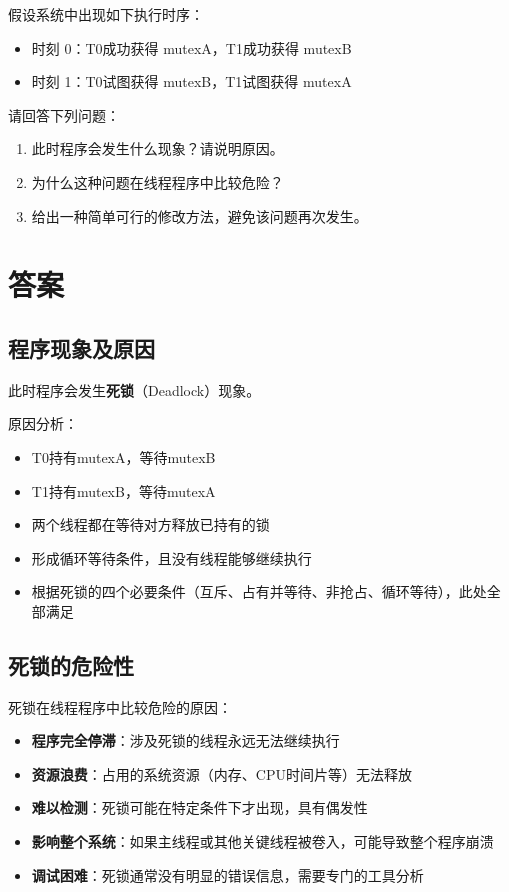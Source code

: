 假设系统中出现如下执行时序：
\begin{itemize}
    \item 时刻 0：T0成功获得 mutexA，T1成功获得 mutexB
    \item 时刻 1：T0试图获得 mutexB，T1试图获得 mutexA
\end{itemize}

请回答下列问题：
\begin{enumerate}
    \item 此时程序会发生什么现象？请说明原因。
    \item 为什么这种问题在线程程序中比较危险？
    \item 给出一种简单可行的修改方法，避免该问题再次发生。
\end{enumerate}

\section{答案}
\subsection{程序现象及原因}

此时程序会发生\textbf{死锁}（Deadlock）现象。

原因分析：
\begin{itemize}
    \item T0持有mutexA，等待mutexB
    \item T1持有mutexB，等待mutexA  
    \item 两个线程都在等待对方释放已持有的锁
    \item 形成循环等待条件，且没有线程能够继续执行
    \item 根据死锁的四个必要条件（互斥、占有并等待、非抢占、循环等待），此处全部满足
\end{itemize}

\subsection{死锁的危险性}

死锁在线程程序中比较危险的原因：
\begin{itemize}
    \item \textbf{程序完全停滞}：涉及死锁的线程永远无法继续执行
    \item \textbf{资源浪费}：占用的系统资源（内存、CPU时间片等）无法释放
    \item \textbf{难以检测}：死锁可能在特定条件下才出现，具有偶发性
    \item \textbf{影响整个系统}：如果主线程或其他关键线程被卷入，可能导致整个程序崩溃
    \item \textbf{调试困难}：死锁通常没有明显的错误信息，需要专门的工具分析
\end{itemize}

